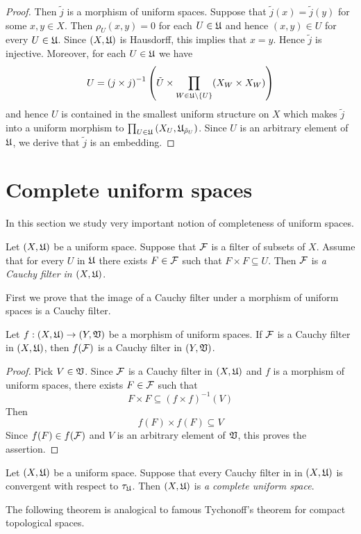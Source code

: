 \begin{proof}
Then $\tilde{j}$ is a morphism of uniform spaces. Suppose that $\tilde{j}(x) = \tilde{j}(y)$ for some $x,y\in X$. Then $\rho_U(x,y) = 0$ for each $U \in {\mathfrak U}$ and hence $(x,y) \in U$ for every $U\in {\mathfrak U}$. Since $(X,{\mathfrak U})$ is Hausdorff, this implies that $x = y$. Hence $\tilde{j}$ is injective. Moreover, for each $U \in {\mathfrak U}$ we have
$$U = \left(j\times j\right)^{-1}\left(\tilde{U}\times \prod_{W\in {\mathfrak U}\setminus \{U\}}(X_W\times X_W)\right)$$
and hence $U$ is contained in the smallest uniform structure on $X$ which makes $\tilde{j}$ into a uniform morphism to $\prod_{U\in {\mathfrak U}}\left(X_U,{\mathfrak U}_{\tilde{\rho}_U}\right)$. Since $U$ is an arbitrary element of ${\mathfrak U}$, we derive that $\tilde{j}$ is an embedding.
\end{proof}

\section{Complete uniform spaces}
\noindent
In this section we study very important notion of completeness of uniform spaces.

\begin{definition}
Let $(X,{\mathfrak U})$ be a uniform space. Suppose that ${\mathcal F}$ is a filter of subsets of $X$. Assume that for every $U$ in ${\mathfrak U}$ there exists $F \in {\mathcal F}$ such that $F\times F\subseteq U$. Then ${\mathcal F}$ is \textit{a Cauchy filter in $\left(X,{\mathfrak U}\right)$}.
\end{definition}
\noindent
First we prove that the image of a Cauchy filter under a morphism of uniform spaces is a Cauchy filter.

\begin{fact}\label{fact:images_of_Cauchy_filters_under_uniform_morphisms_are_Cauchy}
Let $f:\left(X,{\mathfrak U}\right)\rightarrow \left(Y,{\mathfrak V}\right)$ be a morphism of uniform spaces. If ${\mathcal F}$ is a Cauchy filter in $\left(X,{\mathfrak U}\right)$, then $f({\mathcal F})$ is a Cauchy filter in $\left(Y,{\mathfrak V}\right)$.
\end{fact}
\begin{proof}
Pick $V \in {\mathfrak V}$. Since ${\mathcal F}$ is a Cauchy filter in $\left(X,{\mathfrak U}\right)$ and $f$ is a morphism of uniform spaces, there exists $F \in {\mathcal F}$ such that $$F\times F \subseteq (f\times f)^{-1}(V)$$
Then
$$f(F)\times f(F)\subseteq V$$
Since $f(F) \in f({\mathcal F})$ and $V$ is an arbitrary element of ${\mathfrak V}$, this proves the assertion.
\end{proof}

\begin{definition}
Let $(X,{\mathfrak U})$ be a uniform space. Suppose that every Cauchy filter in in $\left(X,{\mathfrak U}\right)$ is convergent with respect to $\tau_{{\mathfrak U}}$. Then $\left(X,{\mathfrak U}\right)$ is \textit{a complete uniform space}. 
\end{definition}
\noindent
The following theorem is analogical to famous Tychonoff's theorem for compact topological spaces.

